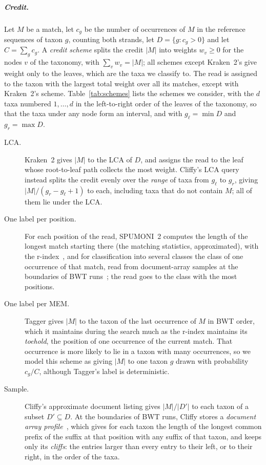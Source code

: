 \subparagraph*{Credit.}
Let $M$ be a match, let $c_g$ be the number of occurrences of $M$ in the reference sequences of taxon $g$, counting both strands, let $D = \{g : c_g > 0\}$ and let $C = \sum_g c_g$.
A \emph{credit scheme} splits the credit $|M|$ into weights $w_v \geq 0$ for the nodes $v$ of the taxonomy, with $\sum_v w_v = |M|$; all schemes except Kraken~2's give weight only to the leaves, which are the taxa we classify to.
The read is assigned to the taxon with the largest total weight over all its matches, except with Kraken~2's scheme.
Table~\ref{tab:schemes} lists the schemes we consider, with the $d$ taxa numbered $1, \ldots, d$ in the left-to-right order of the leaves of the taxonomy, so that the taxa under any node form an interval, and with $g_\ell = \min D$ and $g_r = \max D$.
\begin{description}
\item[LCA.] Kraken~2 gives $|M|$ to the LCA of $D$, and assigns the read to the leaf whose root-to-leaf path collects the most weight.
Cliffy's LCA query instead splits the credit evenly over the \emph{range} of taxa from $g_\ell$ to $g_r$, giving $|M|/(g_r - g_\ell + 1)$ to each, including taxa that do not contain $M$; all of them lie under the LCA.
\item[One label per position.] For each position of the read, SPUMONI~2 computes the length of the longest match starting there (the matching statistics, approximated), with the r-index~\cite{GagieNavarroPrezza2020}, and for classification into several classes the class of one occurrence of that match, read from document-array samples at the boundaries of BWT runs~\cite{AhmedEtAl2023}; the read goes to the class with the most positions.
\item[One label per MEM.] Tagger gives $|M|$ to the taxon of the last occurrence of $M$ in BWT order, which it maintains during the search much as the r-index maintains its \emph{toehold}, the position of one occurrence of the current match.
That occurrence is more likely to lie in a taxon with many occurrences, so we model this scheme as giving $|M|$ to one taxon $g$ drawn with probability $c_g / C$, although Tagger's label is deterministic.
\item[Sample.] Cliffy's approximate document listing gives $|M|/|D'|$ to each taxon of a subset $D' \subseteq D$.
At the boundaries of BWT runs, Cliffy stores a \emph{document array profile}~\cite{ARBL23}, which gives for each taxon the length of the longest common prefix of the suffix at that position with any suffix of that taxon, and keeps only its \emph{cliffs}: the entries larger than every entry to their left, or to their right, in the order of the taxa.

\end{description}
